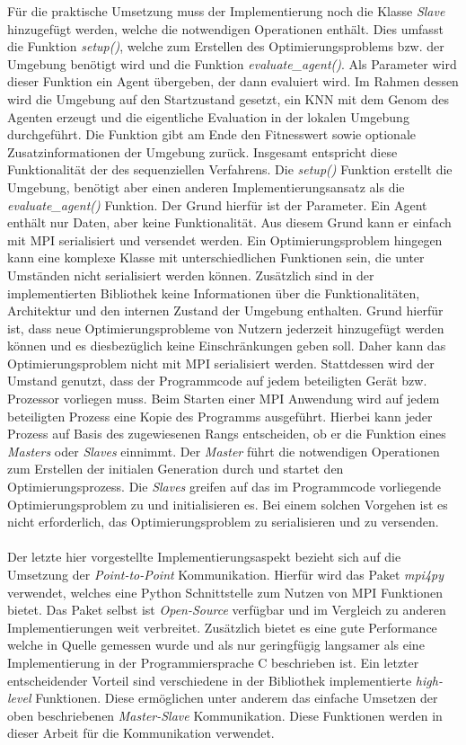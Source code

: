 Für die praktische Umsetzung muss der Implementierung noch die Klasse \emph{Slave} hinzugefügt werden, welche die notwendigen Operationen enthält. Dies umfasst die Funktion \emph{setup()}, welche zum Erstellen des Optimierungsproblems bzw. der Umgebung benötigt wird und die Funktion \emph{evaluate\_agent()}. Als Parameter wird dieser Funktion ein Agent übergeben, der dann evaluiert wird. Im Rahmen dessen wird die Umgebung auf den Startzustand gesetzt, ein \ac{KNN} mit dem Genom des Agenten erzeugt und die eigentliche Evaluation in der lokalen Umgebung durchgeführt. Die Funktion gibt am Ende den Fitnesswert sowie optionale Zusatzinformationen der Umgebung zurück. Insgesamt entspricht diese Funktionalität der des sequenziellen Verfahrens. Die \emph{setup()} Funktion erstellt die Umgebung, benötigt aber einen anderen Implementierungsansatz als die \emph{evaluate\_agent()} Funktion. Der Grund hierfür ist der Parameter. Ein Agent enthält nur Daten, aber keine Funktionalität. Aus diesem Grund kann er einfach mit \ac{MPI} serialisiert und versendet werden. Ein Optimierungsproblem hingegen kann eine komplexe Klasse mit unterschiedlichen Funktionen sein, die unter Umständen nicht serialisiert werden können. Zusätzlich sind in der implementierten Bibliothek keine Informationen über die Funktionalitäten, Architektur und den internen Zustand der Umgebung enthalten. Grund hierfür ist, dass neue Optimierungsprobleme von Nutzern jederzeit hinzugefügt werden können und es diesbezüglich keine Einschränkungen geben soll. Daher kann das Optimierungsproblem nicht mit \ac{MPI} serialisiert werden. Stattdessen wird der Umstand genutzt, dass der Programmcode auf jedem beteiligten Gerät bzw. Prozessor vorliegen muss. Beim Starten einer \ac{MPI} Anwendung wird auf jedem beteiligten Prozess eine Kopie des Programms ausgeführt. Hierbei kann jeder Prozess auf Basis des zugewiesenen Rangs entscheiden, ob er die Funktion eines \emph{Masters} oder \emph{Slaves} einnimmt. Der \emph{Master} führt die notwendigen Operationen zum Erstellen der initialen Generation durch und startet den Optimierungsprozess. Die \emph{Slaves} greifen auf das im Programmcode vorliegende Optimierungsproblem zu und initialisieren es. Bei einem solchen Vorgehen ist es nicht erforderlich, das Optimierungsproblem zu serialisieren und zu versenden.
\\\\
Der letzte hier vorgestellte Implementierungsaspekt bezieht sich auf die Umsetzung der \emph{Point-to-Point} Kommunikation. Hierfür wird das Paket \emph{mpi4py} verwendet, welches eine Python Schnittstelle zum Nutzen von \ac{MPI} Funktionen bietet. Das Paket selbst ist \emph{Open-Source} verfügbar und im Vergleich zu anderen Implementierungen weit verbreitet. Zusätzlich bietet es eine gute Performance welche in Quelle \cite{dalcin2008mpi} gemessen wurde und als nur geringfügig langsamer als eine Implementierung in der Programmiersprache C beschrieben ist. Ein letzter entscheidender Vorteil sind verschiedene in der Bibliothek implementierte \emph{high-level} Funktionen. Diese ermöglichen unter anderem das einfache Umsetzen der oben beschriebenen \emph{Master-Slave} Kommunikation. Diese Funktionen werden in dieser Arbeit für die Kommunikation verwendet.
